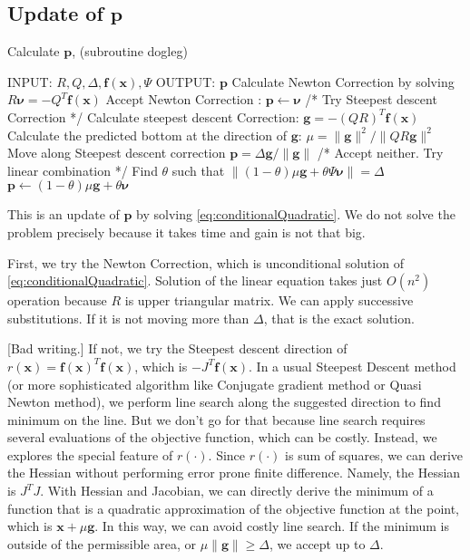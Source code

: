 \documentclass[12pt]{article}
\def\xb{{\mathbf{x}}}
\def\fb{{\mathbf{f}}}
\def\nub{{\mathbf{\nu}}}
\def\gb{{\mathbf{g}}}
\def\pb{{\mathbf{p}}}
\begin{document}
\subsection{Update of $\pb$}
 \begin{algorithm}[ht]
\caption{Calculate  $\pb$, (subroutine dogleg)}
 \label{al:dogleg}
\begin{algorithmic}[1]
\STATE INPUT: $R,Q,\Delta,\fb(\xb),\Psi$
\STATE OUTPUT: $\pb$
\STATE Calculate Newton Correction by solving $R\boldsymbol{\nu} = - Q^{T} \fb (\xb)$
\IF{$\|\boldsymbol{\nu}\|\le \Delta$}
	\STATE  Accept Newton Correction : $\pb \leftarrow \boldsymbol{\nu}$
\ELSE
	\STATE /* Try Steepest descent Correction */
	\STATE Calculate steepest descent Correction: $\boldsymbol{g} = - (QR)^{T} \fb (\xb)$
	\STATE Calculate the predicted bottom at the direction of $\boldsymbol{g}$:
			 $\mu = \| \boldsymbol{g} \|^2 / \| QR\boldsymbol{g} \|^2$
	\IF{$\mu \|\Psi^{-1} \gb\| \ge \Delta$} 
		\STATE Move along Steepest descent correction $\pb = \Delta \gb/\|\gb\|$
	\ELSE
		\STATE /* Accept neither. Try linear combination */
		\STATE Find $\theta$ such that $\|(1-\theta)\mu  \gb + \theta\Psi \nub \| = \Delta$
		\STATE $\pb \leftarrow (1-\theta)\mu \gb + \theta \nub$
	\ENDIF
\ENDIF
\end{algorithmic}
\end{algorithm}

This is an update of $\pb$ by solving \eqref{eq:conditionalQuadratic}. We do not solve the problem
precisely because it takes time and gain is not that big. 

First, we try the Newton Correction, which is unconditional solution of \eqref{eq:conditionalQuadratic}. Solution of the
linear equation takes just $O(n^2)$ operation because $R$ is upper triangular matrix. We can apply
successive substitutions. If it is not moving more than $\Delta$, that is the exact solution. 

[Bad writing.]
If not, we try the Steepest descent direction of $r(\xb)=\fb(\xb)^T\fb(\xb)$, which is $-J^T
\fb(\xb)$. 
In a usual Steepest Descent method (or more sophisticated algorithm like Conjugate
gradient method or Quasi Newton method), we perform line search along the suggested direction to
find minimum on the line. But we don't go for that because line search requires several
evaluations of the objective function, which can be costly. Instead, we explores the special
feature of $r(\cdot)$. Since $r(\cdot)$ is sum of squares, we can derive the Hessian without
performing error prone finite difference. Namely, the Hessian is $J^TJ$. With Hessian and
Jacobian, we can directly derive the minimum of a function that is a quadratic approximation of
the objective function at the point, which is $\xb + \mu \gb$. In this way, we can avoid costly
line search. If the minimum is outside of the permissible area, or $\mu \|\gb\| \ge \Delta$, we
accept up to $\Delta$.
\end{document}
